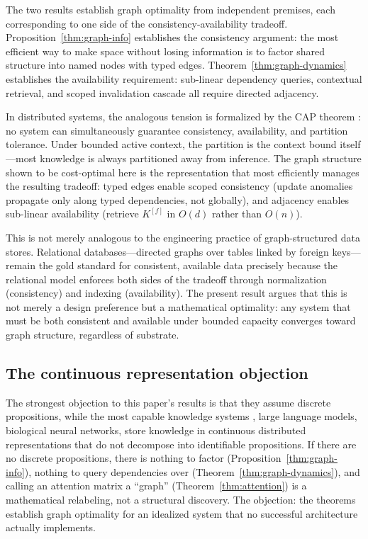 \documentclass[11pt]{article}
\theoremstyle{definition}
\begin{document}
The two results establish graph optimality from independent premises,
each corresponding to one side of the consistency-availability tradeoff.
Proposition~\ref{thm:graph-info} establishes the consistency
argument: the most efficient way to make space without losing information is
to factor shared structure into named nodes with typed edges.
Theorem~\ref{thm:graph-dynamics} establishes the availability
requirement: sub-linear dependency queries, contextual retrieval, and
scoped invalidation cascade all require directed adjacency.

In distributed systems, the analogous tension is formalized by the
CAP theorem \cite{Brewer2000}: no system can simultaneously guarantee
consistency, availability, and partition tolerance. Under bounded
active context, the partition is the context bound itself---most
knowledge is always partitioned away from inference. The graph
structure shown to be cost-optimal here is the representation that
most efficiently manages the resulting tradeoff: typed edges enable scoped consistency
(update anomalies propagate only along typed dependencies, not
globally), and adjacency enables sub-linear availability (retrieve
$K^{[f]}$ in $O(d)$ rather than $O(n)$).

This is not merely analogous to the engineering practice of
graph-structured data stores. Relational databases---directed graphs
over tables linked by foreign keys---remain the gold standard for
consistent, available data precisely because the relational model
enforces both sides of the tradeoff through normalization (consistency)
and indexing (availability). The present result argues that this is
not merely a design preference but a mathematical optimality: any system that
must be both consistent and available under bounded capacity converges
toward graph structure, regardless of substrate.

\subsection{The continuous representation objection}

The strongest objection to this paper's results is that they
assume discrete propositions, while the most capable knowledge systems
, large language models, biological neural networks, store
knowledge in continuous distributed representations that do not
decompose into identifiable propositions. If there are no discrete
propositions, there is nothing to factor
(Proposition~\ref{thm:graph-info}), nothing to query dependencies over
(Theorem~\ref{thm:graph-dynamics}), and calling an attention matrix a
``graph'' (Theorem~\ref{thm:attention}) is a mathematical relabeling,
not a structural discovery. The objection: the theorems establish graph
optimality for an idealized system that no successful architecture
actually implements.
\end{document}
